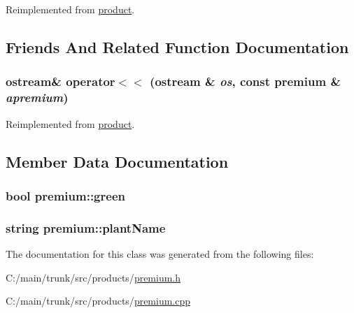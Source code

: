 Reimplemented from \hyperlink{classproduct_a1151ea416ab90047f8d087be57a6d7b1}{product}.

\subsection{Friends And Related Function Documentation}
\hypertarget{classpremium_ad40c91365d71deebcf91e1da3d66d78f}{
\subsubsection[{operator$<$$<$}]{\setlength{\rightskip}{0pt plus 5cm}ostream\& operator$<$$<$ (ostream \& {\em os}, \/  const {\bf premium} \& {\em apremium})}}
\label{classpremium_ad40c91365d71deebcf91e1da3d66d78f}


Reimplemented from \hyperlink{classproduct_a1b6bf2f2c82a18a17907ee1192fd94bb}{product}.

\subsection{Member Data Documentation}
\hypertarget{classpremium_a5a80b0f2ea4bb892c5022f40ec10f4cc}{
\subsubsection[{green}]{\setlength{\rightskip}{0pt plus 5cm}bool {\bf premium::green}}}
\label{classpremium_a5a80b0f2ea4bb892c5022f40ec10f4cc}
\hypertarget{classpremium_a4f05a7a9d1c89cc711eaec81ba7c0065}{
\subsubsection[{plantName}]{\setlength{\rightskip}{0pt plus 5cm}string {\bf premium::plantName}}}
\label{classpremium_a4f05a7a9d1c89cc711eaec81ba7c0065}


The documentation for this class was generated from the following files:\begin{DoxyCompactItemize}
\item 
C:/main/trunk/src/products/\hyperlink{premium_8h}{premium.h}\item 
C:/main/trunk/src/products/\hyperlink{premium_8cpp}{premium.cpp}\end{DoxyCompactItemize}
